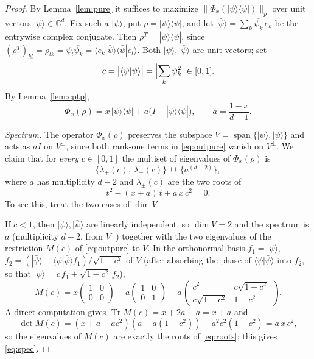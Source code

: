 \documentclass{amsart}
\theoremstyle{definition}
\DeclareMathOperator{\Tr}{Tr}
\begin{document}
\begin{proof}
By Lemma~\ref{lem:pure} it suffices to maximize
$\|\Phi_x(|\psi\rangle\langle\psi|)\|_p$ over unit vectors $|\psi\rangle\in\mathbb
C^d$. Fix such a $|\psi\rangle$, put $\rho=|\psi\rangle\langle\psi|$, and let
$|\bar\psi\rangle=\sum_k\overline{\psi_k}\,e_k$ be the entrywise complex
conjugate. Then $\rho^{T}=|\bar\psi\rangle\langle\bar\psi|$, since
$(\rho^{T})_{kl}=\rho_{lk}=\psi_l\overline{\psi_k}
=\langle e_k|\bar\psi\rangle\langle\bar\psi|e_l\rangle$. Both
$|\psi\rangle,|\bar\psi\rangle$ are unit vectors; set
\[
c=\bigl|\langle\bar\psi|\psi\rangle\bigr|
=\Bigl|\sum_k \psi_k^{2}\Bigr|\in[0,1].
\]
By Lemma~\ref{lem:cptp},
\begin{equation}\label{eq:outpure}
\Phi_x(\rho)=x\,|\psi\rangle\langle\psi|
+a\bigl(I-|\bar\psi\rangle\langle\bar\psi|\bigr),
\qquad a=\frac{1-x}{d-1}.
\end{equation}

\emph{Spectrum.} The operator $\Phi_x(\rho)$ preserves the subspace
$V=\operatorname{span}\{|\psi\rangle,|\bar\psi\rangle\}$ and acts as $aI$ on
$V^{\perp}$, since both rank-one terms in \eqref{eq:outpure} vanish on
$V^{\perp}$. We claim that for \emph{every} $c\in[0,1]$ the multiset of
eigenvalues of $\Phi_x(\rho)$ is
\begin{equation}\label{eq:spec}
\bigl\{\lambda_+(c),\ \lambda_-(c)\bigr\}\ \cup\ \{a^{(d-2)}\},
\end{equation}
where $a$ has multiplicity $d-2$ and $\lambda_\pm(c)$ are the two roots of
\begin{equation}\label{eq:roots}
t^{2}-(x+a)\,t+a\,x\,c^{2}=0 .
\end{equation}
To see this, treat the two cases of $\dim V$.

If $c<1$, then $|\psi\rangle,|\bar\psi\rangle$ are linearly independent, so
$\dim V=2$ and the spectrum is $a$ (multiplicity $d-2$, from $V^{\perp}$)
together with the two eigenvalues of the restriction $M(c)$ of
\eqref{eq:outpure} to $V$. In the orthonormal basis $f_1=|\psi\rangle$,
$f_2=(|\bar\psi\rangle-\langle\psi|\bar\psi\rangle f_1)/\sqrt{1-c^{2}}$ of $V$
(after absorbing the phase of $\langle\psi|\bar\psi\rangle$ into $f_2$, so that
$|\bar\psi\rangle=c\,f_1+\sqrt{1-c^{2}}\,f_2$),
\[
M(c)=x\begin{pmatrix}1&0\\0&0\end{pmatrix}
+a\begin{pmatrix}1&0\\0&1\end{pmatrix}
-a\begin{pmatrix}c^{2}&c\sqrt{1-c^{2}}\\c\sqrt{1-c^{2}}&1-c^{2}\end{pmatrix}.
\]
A direct computation gives $\Tr M(c)=x+2a-a=x+a$ and
\[
\det M(c)=(x+a-ac^{2})(a-a(1-c^{2}))-a^{2}c^{2}(1-c^{2})=a\,x\,c^{2},
\]
so the eigenvalues of $M(c)$ are exactly the roots of \eqref{eq:roots}; this
gives \eqref{eq:spec}.


\end{proof}
\end{document}
